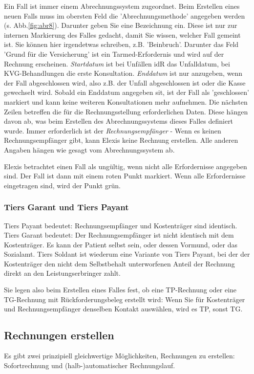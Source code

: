 \documentclass[a4paper]{scrartcl}
\begin{document}
Ein Fall ist immer einem Abrechnungssystem zugeordnet. Beim Erstellen eines neuen Falls muss im obersten Feld die 'Abrechnungsmethode' angegeben werden (s. Abb.\ref{fig:abr8}).
Darunter geben Sie eine Bezeichnung ein. Diese ist nur zur internen Markierung des Falles gedacht, damit Sie wissen, welcher Fall gemeint ist. Sie können hier irgendetwas schreiben, z.B. 'Beinbruch'.
Darunter das Feld 'Grund für die Versicherung' ist ein Tarmed-Erfordernis und wird auf der Rechnung erscheinen.
\textit{Startdatum} ist bei Unfällen idR das Unfalldatum, bei KVG-Behandlungen die erste Konsultation.
\textit{Enddatum} ist nur anzugeben, wenn der Fall abgeschlossen wird, also z.B. der Unfall abgeschlossen ist oder die Kasse gewechselt wird. Sobald ein Enddatum angegeben sit, ist der Fall als 'geschlossen' markiert und kann keine weiteren Konsultationen mehr aufnehmen.
Die nächsten Zeilen betreffen die für die Rechnungsstellung erforderlichen Daten. Diese hängen davon ab, was beim Erstellen des Abrechnungssystems dieses Falles definiert wurde.
Immer erforderlich ist der \textit{Rechnungsempfänger} - Wenn es keinen Rechnungsempfänger gibt, kann Elexis keine Rechnung erstellen.
Alle anderen Angaben hängen wie gesagt vom Abrechnungssystem ab.

Elexis betrachtet einen Fall als ungültig, wenn nicht alle Erfordernisse angegeben sind. Der Fall ist dann mit einem roten Punkt markiert. Wenn alle Erfordernisse eingetragen sind, wird der Punkt grün.

\subsubsection{Tiers Garant und Tiers Payant}
Tiers Payant bedeutet: Rechnungsempfänger und Kostenträger sind identisch. Tiers Garant bedeutet: Der Rechnungsempfänger ist nicht identisch mit dem Kostenträger. Es kann der Patient selbst sein, oder dessen Vormund, oder das Sozialamt. Tiers Soldant ist wiederum eine Variante von Tiers Payant, bei der der Kostenträger den nicht dem Selbstbehalt unterworfenen Anteil der Rechnung direkt an den Leistungserbringer zahlt.

Sie legen also beim Erstellen eines Falles fest, ob eine TP-Rechnung oder eine TG-Rechnung mit Rückforderungsbeleg erstellt wird: Wenn Sie für Kostenträger und Rechnungsempfänger denselben Kontakt auswählen, wird es TP, sonst TG.

\subsection{Rechnungen erstellen}
Es gibt zwei prinzipiell gleichwertige Möglichkeiten, Rechnungen zu erstellen: Sofortrechnung und (halb-)automatischer Rechnungslauf.
\end{document}
